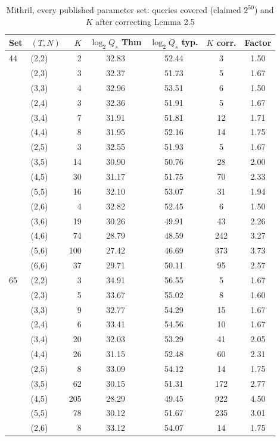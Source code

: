 \documentclass[10pt,conference,a4paper]{IEEEtran}
\begin{document}
\begin{table}[t]
\caption{Mithril, every published parameter set: queries covered (claimed $2^{50}$) and $K$ after correcting Lemma 2.5}
\label{tab:mithrilall}
\centering\footnotesize
\begin{tabular}{@{}llrcccc@{}}
\toprule
Set & $(T,N)$ & $K$ & $\log_2 Q_s$ Thm & $\log_2 Q_s$ typ. & $K$ corr. & Factor\\
\midrule
44 & (2,2) & 2 & 32.83 & 52.44 & 3 & 1.50\\
 & (2,3) & 3 & 32.37 & 51.73 & 5 & 1.67\\
 & (3,3) & 4 & 32.96 & 53.51 & 6 & 1.50\\
 & (2,4) & 3 & 32.36 & 51.91 & 5 & 1.67\\
 & (3,4) & 7 & 31.91 & 51.81 & 12 & 1.71\\
 & (4,4) & 8 & 31.95 & 52.16 & 14 & 1.75\\
 & (2,5) & 3 & 32.55 & 51.93 & 5 & 1.67\\
 & (3,5) & 14 & 30.90 & 50.76 & 28 & 2.00\\
 & (4,5) & 30 & 31.17 & 51.75 & 70 & 2.33\\
 & (5,5) & 16 & 32.10 & 53.07 & 31 & 1.94\\
 & (2,6) & 4 & 32.82 & 52.45 & 6 & 1.50\\
 & (3,6) & 19 & 30.26 & 49.91 & 43 & 2.26\\
 & (4,6) & 74 & 28.79 & 48.59 & 242 & 3.27\\
 & (5,6) & 100 & 27.42 & 46.69 & 373 & 3.73\\
 & (6,6) & 37 & 29.71 & 50.11 & 95 & 2.57\\
\midrule
65 & (2,2) & 3 & 34.91 & 56.55 & 5 & 1.67\\
 & (2,3) & 5 & 33.67 & 55.02 & 8 & 1.60\\
 & (3,3) & 9 & 32.77 & 54.29 & 15 & 1.67\\
 & (2,4) & 6 & 33.41 & 54.56 & 10 & 1.67\\
 & (3,4) & 20 & 32.03 & 53.29 & 41 & 2.05\\
 & (4,4) & 26 & 31.15 & 52.48 & 60 & 2.31\\
 & (2,5) & 8 & 33.09 & 54.12 & 14 & 1.75\\
 & (3,5) & 62 & 30.15 & 51.31 & 172 & 2.77\\
 & (4,5) & 205 & 28.29 & 49.45 & 922 & 4.50\\
 & (5,5) & 78 & 30.12 & 51.67 & 235 & 3.01\\
 & (2,6) & 8 & 33.12 & 54.07 & 14 & 1.75\\

\end{tabular}
\end{table}
\end{document}
